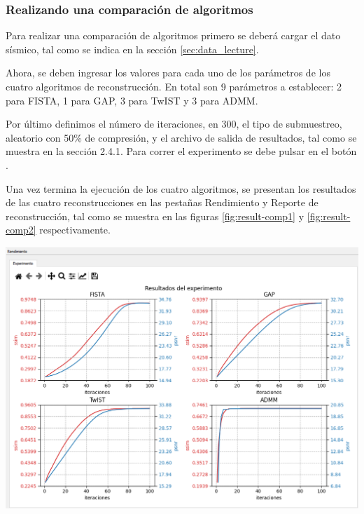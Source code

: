\documentclass[12pt,twoside,letter]{ol-softwaremanual}
\newenvironment{Figure}
  {\par\medskip\noindent\minipage{\linewidth}}
  {\endminipage\par\medskip}
\begin{document}
\subsubsection*{Realizando una comparación de algoritmos}

Para realizar una comparación de algoritmos primero se deberá cargar el dato sísmico, tal como se indica en la sección \ref{sec:data_lecture}.

Ahora, se deben ingresar los valores para cada uno de los parámetros de los cuatro algoritmos de reconstrucción. En total son 9 parámetros a establecer: 2 para FISTA, 1 para GAP, 3 para TwIST y 3 para ADMM.

Por último definimos el número de iteraciones, en 300, el tipo de submuestreo, aleatorio con 50\% de compresión, y el archivo de salida de resultados, tal como se muestra en la sección 2.4.1. Para correr el experimento se debe pulsar en el botón \hspace{0.5mm} \faPlay \hspace{0.5mm}.

Una vez termina la ejecución de los cuatro algoritmos, se presentan los resultados de las cuatro reconstrucciones en las pestañas Rendimiento y Reporte de reconstrucción, tal como se muestra en las figuras \ref{fig:result-comp1} y \ref{fig:result-comp2} respectivamente.

\begin{Figure}
	\centering
	\includegraphics[width=0.9\linewidth]{result-comp1.png}
	\label{fig:result-comp1}
\end{Figure}
\end{document}
